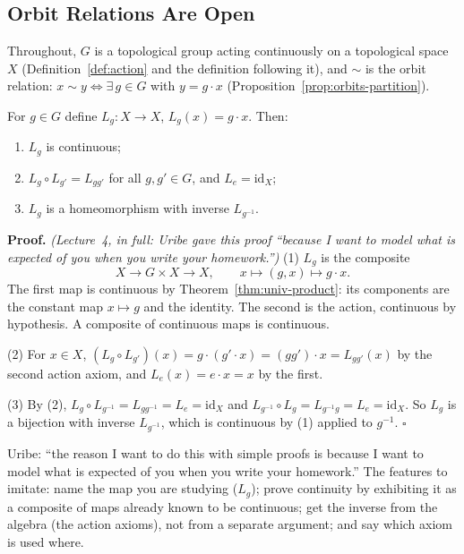 \documentclass[11pt]{report}
\makeatletter
\newcounter{thmcounter}[section]
\renewenvironment{proof}[1][Proof]{\noindent\textbf{#1.} }{\hfill$\square$\par\vspace{5pt}}
\newcommand{\thmlabel}[1]{\edef\@currentlabel{\arabic{section}.\arabic{thmcounter}}\label{#1}}
\newcommand{\leeref}[1]{\par\smallskip{\raggedleft\footnotesize\textsc{Lee}:\ #1\par}}
\makeatother
\begin{document}
\subsection{Orbit Relations Are Open}

Throughout, $G$ is a topological group acting continuously on a topological space $X$ (Definition~\ref{def:action} and the definition following it), and $\sim$ is the orbit relation: $x \sim y \iff \exists\, g \in G$ with $y = g \cdot x$ (Proposition~\ref{prop:orbits-partition}).

\begin{lembox}\thmlabel{lem:Lg}
For $g \in G$ define $L_g : X \to X$, $L_g(x) = g \cdot x$. Then:
\begin{enumerate}
    \item $L_g$ is continuous;
    \item $L_g \circ L_{g'} = L_{gg'}$ for all $g, g' \in G$, and $L_e = \mathrm{id}_X$;
    \item $L_g$ is a homeomorphism with inverse $L_{g^{-1}}$.
\end{enumerate}
\leeref{proof of Lemma 21.1}
\end{lembox}

\begin{proof}
\textit{(Lecture~4, in full: Uribe gave this proof ``because I want to model what is expected of you when you write your homework.'')} (1) $L_g$ is the composite
\[
X \longrightarrow G \times X \longrightarrow X, \qquad x \longmapsto (g, x) \longmapsto g \cdot x .
\]
The first map is continuous by Theorem~\ref{thm:univ-product}: its components are the constant map $x \mapsto g$ and the identity. The second is the action, continuous by hypothesis. A composite of continuous maps is continuous.

(2) For $x \in X$, $(L_g \circ L_{g'})(x) = g \cdot (g' \cdot x) = (gg') \cdot x = L_{gg'}(x)$ by the second action axiom, and $L_e(x) = e \cdot x = x$ by the first.

(3) By (2), $L_g \circ L_{g^{-1}} = L_{gg^{-1}} = L_e = \mathrm{id}_X$ and $L_{g^{-1}} \circ L_g = L_{g^{-1}g} = L_e = \mathrm{id}_X$. So $L_g$ is a bijection with inverse $L_{g^{-1}}$, which is continuous by (1) applied to $g^{-1}$.
\end{proof}

\begin{rembox}\label{rem:model-proof}
Uribe: ``the reason I want to do this with simple proofs is because I want to model what is expected of you when you write your homework.'' The features to imitate: name the map you are studying ($L_g$); prove continuity by exhibiting it as a composite of maps already known to be continuous; get the inverse from the algebra (the action axioms), not from a separate argument; and say which axiom is used where.
\end{rembox}
\end{document}
